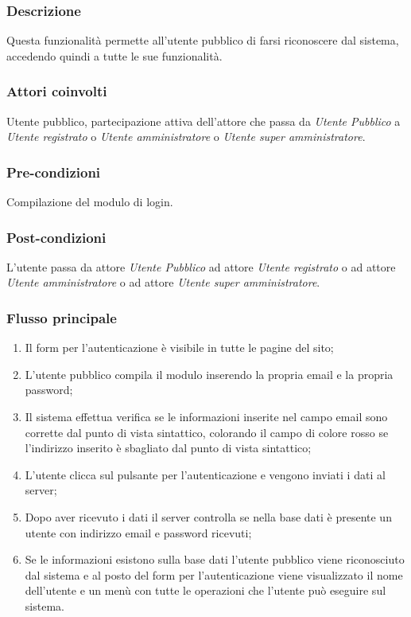	\subsubsection*{Descrizione}
	Questa funzionalità permette all'utente pubblico di farsi riconoscere dal sistema, accedendo quindi a tutte le sue funzionalità.
	
	\subsubsection*{Attori coinvolti}
	Utente pubblico, partecipazione attiva dell'attore che passa da \emph{Utente Pubblico} a \emph{Utente registrato} o \emph{Utente amministratore} o \emph{Utente super amministratore}.
	
	\subsubsection*{Pre-condizioni}
	Compilazione del modulo di login.
	
	\subsubsection*{Post-condizioni}
	L'utente passa da attore \emph{Utente Pubblico} ad attore \emph{Utente registrato} o ad attore \emph{Utente amministratore} o ad attore \emph{Utente super amministratore}.
	
	\subsubsection*{Flusso principale}
	
	\begin{enumerate}
		
		\item
		Il form per l'autenticazione è visibile in tutte le pagine del sito;
		
		\item
		L'utente pubblico compila il modulo inserendo la propria email e la propria password;
		
		\item
		Il sistema effettua verifica se le informazioni inserite nel campo email sono corrette dal punto di vista sintattico, colorando il campo di colore rosso se l'indirizzo inserito è sbagliato dal punto di vista sintattico;
		
		\item
		L'utente clicca sul pulsante per l'autenticazione e vengono inviati i dati al server;
		
		\item
		Dopo aver ricevuto i dati il server controlla se nella base dati è presente un utente con indirizzo email e password ricevuti;
		
		\item
		Se le informazioni esistono sulla base dati l'utente pubblico viene riconosciuto dal sistema e al posto del form per l'autenticazione viene visualizzato il nome dell'utente e un menù con tutte le operazioni che l'utente può eseguire sul sistema.
		
	\end{enumerate}
	
